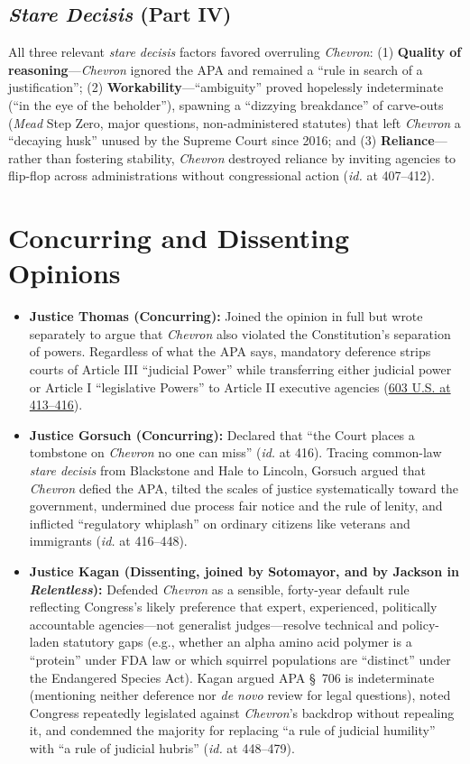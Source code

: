 \documentclass[12pt]{article}
\begin{document}
\subsection{\textit{Stare Decisis} (Part IV)}

All three relevant \textit{stare decisis} factors favored overruling \textit{Chevron}: (1) \textbf{Quality of reasoning}---\textit{Chevron} ignored the APA and remained a ``rule in search of a justification''; (2) \textbf{Workability}---``ambiguity'' proved hopelessly indeterminate (``in the eye of the beholder''), spawning a ``dizzying breakdance'' of carve-outs (\textit{Mead} Step Zero, major questions, non-administered statutes) that left \textit{Chevron} a ``decaying husk'' unused by the Supreme Court since 2016; and (3) \textbf{Reliance}---rather than fostering stability, \textit{Chevron} destroyed reliance by inviting agencies to flip-flop across administrations without congressional action (\textit{id.} at 407--412).

\section{Concurring and Dissenting Opinions}

\begin{itemize}
  \item \textbf{Justice Thomas (Concurring):} Joined the opinion in full but wrote separately to argue that \textit{Chevron} also violated the Constitution's separation of powers. Regardless of what the APA says, mandatory deference strips courts of Article III ``judicial Power'' while transferring either judicial power or Article I ``legislative Powers'' to Article II executive agencies (\href{https://www.law.cornell.edu/supremecourt/text/22-451}{603 U.S. at 413--416}).
  \item \textbf{Justice Gorsuch (Concurring):} Declared that ``the Court places a tombstone on \textit{Chevron} no one can miss'' (\textit{id.} at 416). Tracing common-law \textit{stare decisis} from Blackstone and Hale to Lincoln, Gorsuch argued that \textit{Chevron} defied the APA, tilted the scales of justice systematically toward the government, undermined due process fair notice and the rule of lenity, and inflicted ``regulatory whiplash'' on ordinary citizens like veterans and immigrants (\textit{id.} at 416--448).
  \item \textbf{Justice Kagan (Dissenting, joined by Sotomayor, and by Jackson in \textit{Relentless}):} Defended \textit{Chevron} as a sensible, forty-year default rule reflecting Congress's likely preference that expert, experienced, politically accountable agencies---not generalist judges---resolve technical and policy-laden statutory gaps (e.g., whether an alpha amino acid polymer is a ``protein'' under FDA law or which squirrel populations are ``distinct'' under the Endangered Species Act). Kagan argued APA \S~706 is indeterminate (mentioning neither deference nor \textit{de novo} review for legal questions), noted Congress repeatedly legislated against \textit{Chevron}'s backdrop without repealing it, and condemned the majority for replacing ``a rule of judicial humility'' with ``a rule of judicial hubris'' (\textit{id.} at 448--479).
\end{itemize}
\end{document}

